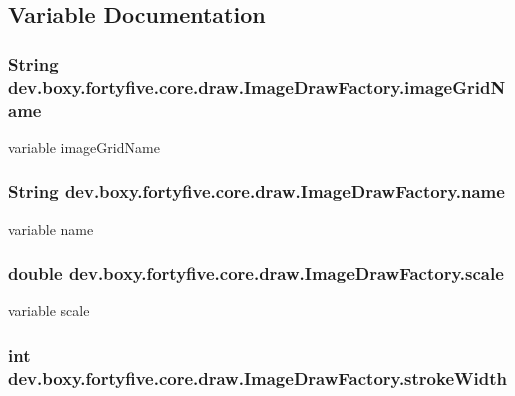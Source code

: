 \subsection{Variable Documentation}
\hypertarget{group__image_ga449860e416518546c82bd58fd6ca2c0d}{
\subsubsection[{imageGridName}]{\setlength{\rightskip}{0pt plus 5cm}String {\bf dev.boxy.fortyfive.core.draw.ImageDrawFactory.imageGridName}}}
\label{dd/d57/group__image_ga449860e416518546c82bd58fd6ca2c0d}
variable imageGridName \hypertarget{group__image_ga0b4425fc6fc125f08a69acd817b3e928}{
\subsubsection[{name}]{\setlength{\rightskip}{0pt plus 5cm}String {\bf dev.boxy.fortyfive.core.draw.ImageDrawFactory.name}}}
\label{dd/d57/group__image_ga0b4425fc6fc125f08a69acd817b3e928}
variable name \hypertarget{group__image_ga49b6468f905e5801eb9fb81931de7a00}{
\subsubsection[{scale}]{\setlength{\rightskip}{0pt plus 5cm}double {\bf dev.boxy.fortyfive.core.draw.ImageDrawFactory.scale}}}
\label{dd/d57/group__image_ga49b6468f905e5801eb9fb81931de7a00}
variable scale \hypertarget{group__image_ga55543d51eec3d277bc6141062937ac94}{
\subsubsection[{strokeWidth}]{\setlength{\rightskip}{0pt plus 5cm}int {\bf dev.boxy.fortyfive.core.draw.ImageDrawFactory.strokeWidth}}}
\label{dd/d57/group__image_ga55543d51eec3d277bc6141062937ac94}
